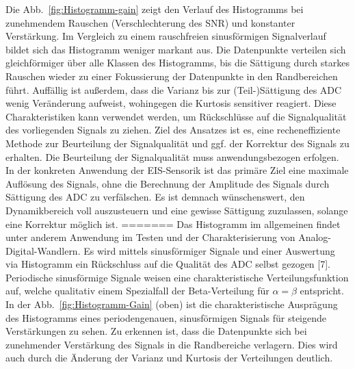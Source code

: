 Die Abb.~\ref{fig:Histogramm-gain} zeigt den Verlauf des Histogramms bei zunehmendem Rauschen (Verschlechterung des SNR) und konstanter Verstärkung. Im Vergleich zu einem rauschfreien sinusförmigen Signalverlauf bildet sich das Histogramm weniger markant aus. Die Datenpunkte verteilen sich gleichförmiger über alle Klassen des Histogramms, bis die Sättigung durch starkes Rauschen wieder zu einer Fokussierung der Datenpunkte in den Randbereichen führt. Auffällig ist außerdem, dass die Varianz bis zur (Teil-)Sättigung des ADC wenig Veränderung aufweist, wohingegen die Kurtosis sensitiver reagiert. Diese Charakteristiken kann verwendet werden, um Rückschlüsse auf die Signalqualität des vorliegenden Signals zu ziehen. Ziel des Ansatzes ist es, eine recheneffiziente Methode zur Beurteilung der Signalqualität und ggf. der Korrektur des Signals zu erhalten. Die Beurteilung der Signalqualität muss anwendungsbezogen erfolgen. In der konkreten Anwendung der EIS-Sensorik ist das primäre Ziel eine maximale Auflösung des Signals, ohne die Berechnung der Amplitude des Signals durch Sättigung des ADC zu verfälschen. Es ist demnach wünschenswert, den Dynamikbereich voll auszusteuern und eine gewisse Sättigung zuzulassen, solange eine Korrektur möglich ist.
=======
Das Histogramm im allgemeinen findet unter anderem Anwendung im Testen und der Charakterisierung von Analog-Digital-Wandlern. Es wird mittels sinusförmiger Signale und einer Auswertung via Histogramm ein Rückschluss auf die Qualität des ADC selbst gezogen [7]. Periodische sinusförmige Signale weisen eine charakteristische Verteilungsfunktion auf, welche qualitativ einem Spezialfall der Beta-Verteilung für $\alpha = \beta$ entspricht. In der Abb.~\ref{fig:Histogramm-Gain} (oben) ist die charakteristische Ausprägung des Histogramms eines periodengenauen, sinusförmigen Signals für steigende Verstärkungen zu sehen. Zu erkennen ist, dass die Datenpunkte sich bei zunehmender Verstärkung des Signals in die Randbereiche verlagern. Dies wird auch durch die Änderung der Varianz und Kurtosis der Verteilungen deutlich.
